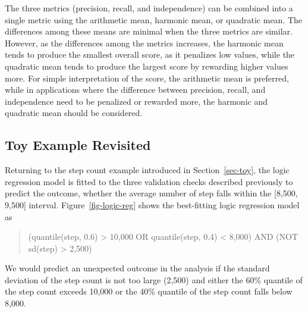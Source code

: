 \documentclass[
  12pt,
]{interact}
\begin{document}
The three metrics (precision, recall, and independence) can be combined
into a single metric using the arithmetic mean, harmonic mean, or
quadratic mean. The differences among these means are minimal when the
three metrics are similar. However, as the differences among the metrics
increases, the harmonic mean tends to produce the smallest overall
score, as it penalizes low values, while the quadratic mean tends to
produce the largest score by rewarding higher values more. For simple
interpretation of the score, the arithmetic mean is preferred, while in
applications where the difference between precision, recall, and
independence need to be penalized or rewarded more, the harmonic and
quadratic mean should be considered.

\subsection{Toy Example Revisited}\label{toy-example-revisited}

Returning to the step count example introduced in Section~\ref{sec-toy},
the logic regression model is fitted to the three validation checks
described previously to predict the outcome, whether the average number
of step falls within the {[}8,500, 9,500{]} interval.
Figure~\ref{fig-logic-reg} shows the best-fitting logic regression model
as

\begin{quote}
(quantile(step, 0.6) \textgreater{} 10,000 OR quantile(step, 0.4)
\textless{} 8,000) AND (NOT sd(step) \textgreater{} 2,500)
\end{quote}

We would predict an unexpected outcome in the analysis if the standard
deviation of the step count is not too large (2,500) and either the 60\%
quantile of the step count exceeds 10,000 or the 40\% quantile of the
step count falls below 8,000.
\end{document}
